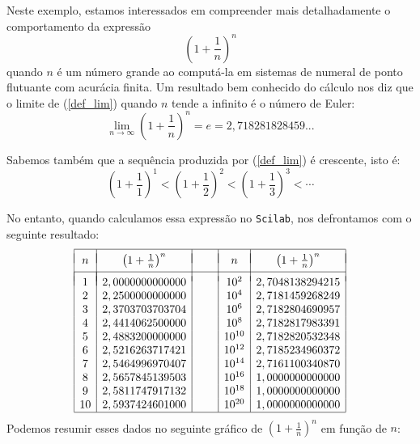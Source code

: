 \begin{ex} Neste exemplo, estamos interessados em compreender mais detalhadamente o comportamento da expressão
\begin{equation}\label{def_lim}\left(1+\frac{1}{n}\right)^n\end{equation}
quando $n$ é um número grande ao computá-la em sistemas de numeral de ponto flutuante com acurácia finita.
Um resultado bem conhecido do cálculo nos diz que o limite de (\ref{def_lim}) quando $n$ tende a infinito é o número de Euler:
\begin{equation}\label{lim}\lim_{n\to \infty}\left(1+\frac{1}{n}\right)^n=e= 2,718281828459...\end{equation}

Sabemos também que a sequência produzida por (\ref{def_lim}) é crescente, isto é:
$$\left(1+\frac{1}{1}\right)^1< \left(1+\frac{1}{2}\right)^2< \left(1+\frac{1}{3}\right)^3 < \cdots $$

No entanto, quando calculamos essa expressão no \verb+Scilab+, nos defrontamos com o seguinte resultado:
$$\begin{array}{|c|c|c|c|c|}
\hline &&&&\\[-0.3cm]
n & \left(1+\frac{1}{n}\right)^n&~~~~&n & \left(1+\frac{1}{n}\right)^n\\
 &&&&\\[-0.3cm]
\hline\\[-0.3cm]
1 & 2,0000000000000 && 10^{2} & 2,7048138294215 \\
2 & 2,2500000000000 && 10^{4} & 2,7181459268249 \\
3 & 2,3703703703704 && 10^{6} & 2,7182804690957 \\
4 & 2,4414062500000 && 10^{8} & 2,7182817983391 \\
5 & 2,4883200000000 && 10^{10} & 2,7182820532348 \\
6 & 2,5216263717421 && 10^{12} & 2,7185234960372 \\
7 & 2,5464996970407 && 10^{14} & 2,7161100340870 \\
8 & 2,5657845139503 && 10^{16} & 1,0000000000000 \\
9 & 2,5811747917132 && 10^{18} & 1,0000000000000 \\
10 & 2,5937424601000 && 10^{20} & 1,0000000000000 \\
\hline
\end{array}
$$
Podemos resumir esses dados no seguinte gráfico de $\left(1+\frac{1}{n}\right)^n$ em função de $n$:


\end{ex}

